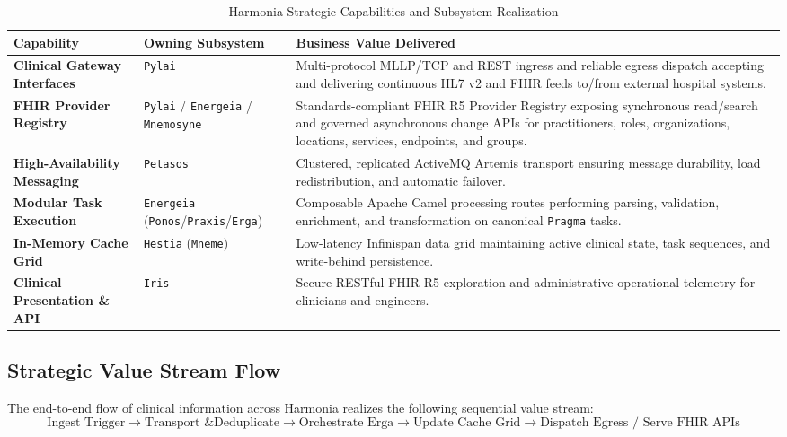 \begin{table}[htbp]
\centering
\small
\begin{tabularx}{\textwidth}{l p{3.5cm} X}
\toprule
\textbf{Capability} & \textbf{Owning Subsystem} & \textbf{Business Value Delivered} \\
\midrule
\textbf{Clinical Gateway Interfaces} & \texttt{Pylai} & Multi-protocol MLLP/TCP and REST ingress and reliable egress dispatch accepting and delivering continuous HL7 v2 and FHIR feeds to/from external hospital systems. \\
\addlinespace
\textbf{FHIR Provider Registry} & \texttt{Pylai} / \texttt{Energeia} / \texttt{Mnemosyne} & Standards-compliant FHIR R5 Provider Registry exposing synchronous read/search and governed asynchronous change APIs for practitioners, roles, organizations, locations, services, endpoints, and groups. \\
\addlinespace
\textbf{High-Availability Messaging} & \texttt{Petasos} & Clustered, replicated ActiveMQ Artemis transport ensuring message durability, load redistribution, and automatic failover. \\
\addlinespace
\textbf{Modular Task Execution} & \texttt{Energeia} (\texttt{Ponos}/\texttt{Praxis}/\texttt{Erga}) & Composable Apache Camel processing routes performing parsing, validation, enrichment, and transformation on canonical \texttt{Pragma} tasks. \\
\addlinespace
\textbf{In-Memory Cache Grid} & \texttt{Hestia} (\texttt{Mneme}) & Low-latency Infinispan data grid maintaining active clinical state, task sequences, and write-behind persistence. \\
\addlinespace
\textbf{Clinical Presentation \& API} & \texttt{Iris} & Secure RESTful FHIR R5 exploration and administrative operational telemetry for clinicians and engineers. \\
\bottomrule
\end{tabularx}
\caption{Harmonia Strategic Capabilities and Subsystem Realization}
\label{tab:strategic_capabilities}
\end{table}

\subsection{Strategic Value Stream Flow}
The end-to-end flow of clinical information across Harmonia realizes the following sequential value stream:
\begin{equation*}
\text{Ingest Trigger} \longrightarrow \text{Transport \& Deduplicate} \longrightarrow \text{Orchestrate Erga} \longrightarrow \text{Update Cache Grid} \longrightarrow \text{Dispatch Egress / Serve FHIR APIs}
\end{equation*}

\newpage
